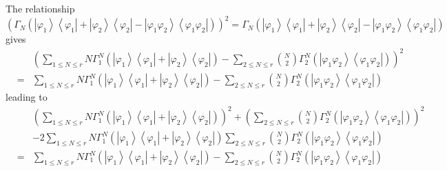 \documentclass[12pt]{article}
\begin{document}
The relationship%
\begin{equation*}
\left( \Gamma _{N}\left( \left\vert \varphi _{1}\right\rangle \left\langle
\varphi _{1}\right\vert +\left\vert \varphi _{2}\right\rangle \left\langle
\varphi _{2}\right\vert -\left\vert \varphi _{1}\varphi _{2}\right\rangle
\left\langle \varphi _{1}\varphi _{2}\right\vert \right) \right) ^{2}=\Gamma
_{N}\left( \left\vert \varphi _{1}\right\rangle \left\langle \varphi
_{1}\right\vert +\left\vert \varphi _{2}\right\rangle \left\langle \varphi
_{2}\right\vert -\left\vert \varphi _{1}\varphi _{2}\right\rangle
\left\langle \varphi _{1}\varphi _{2}\right\vert \right)
\end{equation*}%
gives 
\begin{eqnarray*}
&&\left( \sum_{1\leq N\leq r}N\Gamma _{1}^{N}\left( \left\vert \varphi
_{1}\right\rangle \left\langle \varphi _{1}\right\vert +\left\vert \varphi
_{2}\right\rangle \left\langle \varphi _{2}\right\vert \right) -\sum_{2\leq
N\leq r}\binom{N}{2}\Gamma _{2}^{N}\left( \left\vert \varphi _{1}\varphi
_{2}\right\rangle \left\langle \varphi _{1}\varphi _{2}\right\vert \right)
\right) ^{2} \\
&=&\sum_{1\leq N\leq r}N\Gamma _{1}^{N}\left( \left\vert \varphi
_{1}\right\rangle \left\langle \varphi _{1}\right\vert +\left\vert \varphi
_{2}\right\rangle \left\langle \varphi _{2}\right\vert \right) -\sum_{2\leq
N\leq r}\binom{N}{2}\Gamma _{2}^{N}\left( \left\vert \varphi _{1}\varphi
_{2}\right\rangle \left\langle \varphi _{1}\varphi _{2}\right\vert \right)
\end{eqnarray*}%
leading to 
\begin{eqnarray*}
&&\left( \sum_{1\leq N\leq r}N\Gamma _{1}^{N}\left( \left\vert \varphi
_{1}\right\rangle \left\langle \varphi _{1}\right\vert +\left\vert \varphi
_{2}\right\rangle \left\langle \varphi _{2}\right\vert \right) \right)
^{2}+\left( \sum_{2\leq N\leq r}\binom{N}{2}\Gamma _{2}^{N}\left( \left\vert
\varphi _{1}\varphi _{2}\right\rangle \left\langle \varphi _{1}\varphi
_{2}\right\vert \right) \right) ^{2} \\
&&-2\sum_{1\leq N\leq r}N\Gamma _{1}^{N}\left( \left\vert \varphi
_{1}\right\rangle \left\langle \varphi _{1}\right\vert +\left\vert \varphi
_{2}\right\rangle \left\langle \varphi _{2}\right\vert \right) \sum_{2\leq
N\leq r}\binom{N}{2}\Gamma _{2}^{N}\left( \left\vert \varphi _{1}\varphi
_{2}\right\rangle \left\langle \varphi _{1}\varphi _{2}\right\vert \right) \\
&=&\sum_{1\leq N\leq r}N\Gamma _{1}^{N}\left( \left\vert \varphi
_{1}\right\rangle \left\langle \varphi _{1}\right\vert +\left\vert \varphi
_{2}\right\rangle \left\langle \varphi _{2}\right\vert \right) -\sum_{2\leq
N\leq r}\binom{N}{2}\Gamma _{2}^{N}\left( \left\vert \varphi _{1}\varphi
_{2}\right\rangle \left\langle \varphi _{1}\varphi _{2}\right\vert \right)
\end{eqnarray*}%
\end{document}
